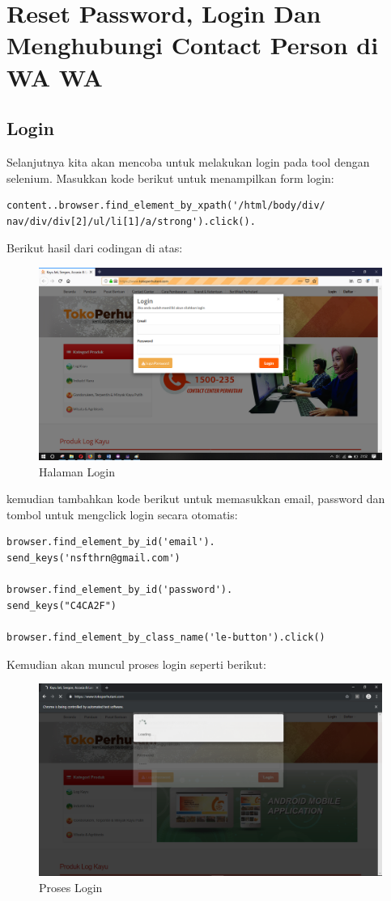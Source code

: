\newpage
\section{Reset Password, Login Dan Menghubungi Contact Person di WA WA}
\subsection{Login}
Selanjutnya kita akan mencoba untuk melakukan login pada tool dengan selenium. 
Masukkan kode berikut untuk menampilkan form login:
\begin{verbatim}
content..browser.find_element_by_xpath('/html/body/div/
nav/div/div[2]/ul/li[1]/a/strong').click().
\end{verbatim}



Berikut hasil dari codingan di atas:
\begin{figure}[h]
	\centering
	\includegraphics[scale=0.20]{figures/0login}
	\caption{Halaman Login}
\end{figure}

kemudian tambahkan kode berikut untuk memasukkan email, password dan tombol untuk mengclick login secara otomatis: 
\begin{verbatim}
browser.find_element_by_id('email').
send_keys('nsfthrn@gmail.com')

browser.find_element_by_id('password').
send_keys("C4CA2F")

browser.find_element_by_class_name('le-button').click() 
\end{verbatim}
\newpage
Kemudian akan muncul proses login seperti berikut:
\begin{figure}[h]
	\centering
	\includegraphics[scale=0.21]{figures/1login}
	\caption{Proses Login}
\end{figure}

